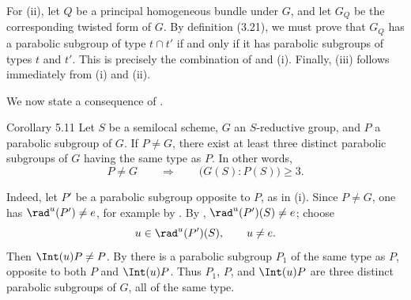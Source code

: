 For \textup{(ii)}, let \(Q\) be a principal homogeneous bundle under
\(G\), and let \(G_Q\) be the corresponding twisted form of \(G\).
By definition \textup{(3.21)}, we must prove that \(G_Q\) has a
parabolic subgroup of type \(t\cap t'\) if and only if it has
parabolic subgroups of types \(t\) and \(t'\).  This is precisely the
combination of  and \textup{(i)}.  Finally, \textup{(iii)}
follows immediately from \textup{(i)} and \textup{(ii)}.

We now state a consequence of .

\begin{sgastatement}{Corollary 5.11}
Let \(S\) be a semilocal scheme, \(G\) an \(S\)-reductive group, and
\(P\) a parabolic subgroup of \(G\).  If \(P\ne G\), there exist at
least three distinct parabolic subgroups of \(G\) having the same
type as \(P\).  In other words,
\[
 P\ne G\qquad\Longrightarrow\qquad
 \bigl(G(S):P(S)\bigr)\geq 3.
\]
\end{sgastatement}

Indeed, let \(P'\) be a parabolic subgroup opposite to \(P\), as in
\textup{(i)}.  Since \(P\ne G\), one has
\(\rad^u(P')\ne e\), for example by .  By ,
\(\rad^u(P')(S)\ne e\); choose
\[
 u\in\rad^u(P')(S),\qquad u\ne e.
\]
Then \(\Int(u)P\ne P\).  By  there is a parabolic subgroup \(P_1\)
of the same type as \(P\), opposite to both \(P\) and \(\Int(u)P\).
Thus \(P_1\), \(P\), and \(\Int(u)P\) are three distinct parabolic
subgroups of \(G\), all of the same type.
\SGAQED



